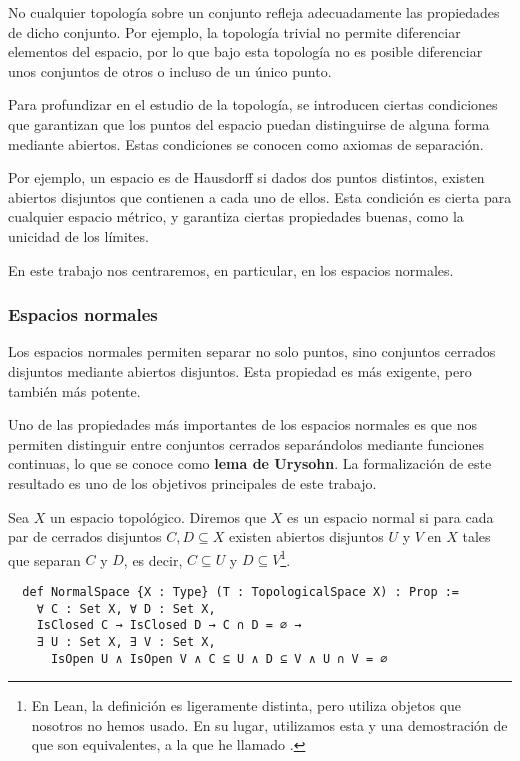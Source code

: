 No cualquier topología sobre un conjunto refleja adecuadamente las propiedades de dicho conjunto. Por ejemplo, la topología trivial no permite diferenciar elementos del espacio, por lo que bajo esta topología no es posible diferenciar unos conjuntos de otros o incluso de un único punto.

Para profundizar en el estudio de la topología, se introducen ciertas condiciones que garantizan que los puntos del espacio puedan distinguirse de alguna forma mediante abiertos. Estas condiciones se conocen como axiomas de separación.

Por ejemplo, un espacio es de Hausdorff si dados dos puntos distintos, existen abiertos disjuntos que contienen a cada uno de ellos. Esta condición es cierta para cualquier espacio métrico, y garantiza ciertas propiedades buenas, como la unicidad de los límites.

En este trabajo nos centraremos, en particular, en los espacios normales.


\subsubsection{Espacios normales}

Los espacios normales permiten separar no solo puntos, sino conjuntos cerrados disjuntos mediante abiertos disjuntos. Esta propiedad es más exigente, pero también más potente.

Uno de las propiedades más importantes de los espacios normales es que nos permiten distinguir entre conjuntos cerrados separándolos mediante funciones continuas, lo que se conoce como \textbf{lema de Urysohn}. La formalización de este resultado es uno de los objetivos principales de este trabajo.


\begin{definition}
  Sea $X$ un espacio topológico. Diremos que $X$ es un espacio \textnormal{normal} si para cada par de cerrados disjuntos $C, D \subseteq X$ existen abiertos disjuntos $U$ y $V$ en $X$ tales  que separan $C$ y $D$, es decir, $C \subseteq U$ y $D \subseteq V$\footnote{En Lean, la definición  es ligeramente distinta, pero utiliza objetos que nosotros no hemos usado. En su lugar, utilizamos esta y una demostración de que son equivalentes, a la que he llamado .}.
\end{definition}

\begin{lstlisting}
  def NormalSpace {X : Type} (T : TopologicalSpace X) : Prop :=
    ∀ C : Set X, ∀ D : Set X,
    IsClosed C → IsClosed D → C ∩ D = ∅ →
    ∃ U : Set X, ∃ V : Set X,
      IsOpen U ∧ IsOpen V ∧ C ⊆ U ∧ D ⊆ V ∧ U ∩ V = ∅
\end{lstlisting}

